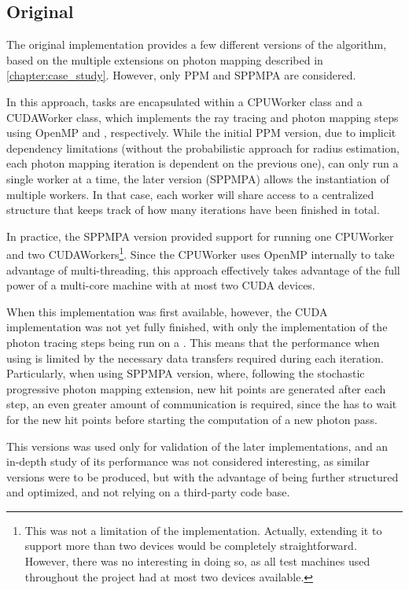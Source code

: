 \documentclass[main.tex]{subfiles}
\begin{document}
\subsection{Original} \label{section:impl_original}

The original implementation provides a few different versions of the algorithm, based on the multiple extensions on photon mapping described in \cref{chapter:case_study}. However, only PPM and SPPMPA are considered.

In this approach, tasks are encapsulated within a CPUWorker class and a CUDAWorker class, which implements the ray tracing and photon mapping steps using \acs{OpenMP} and \cuda, respectively. While the initial PPM version, due to implicit dependency limitations (without the probabilistic approach for radius estimation, each photon mapping iteration is dependent on the previous one), can only run a single worker at a time, the later version (SPPMPA) allows the instantiation of multiple workers. In that case, each worker will share access to a centralized structure that keeps track of how many iterations have been finished in total.

In practice, the SPPMPA version provided support for running one CPUWorker and two CUDAWorkers\footnote{This was not a limitation of the implementation. Actually, extending it to support more than two \cuda devices would be completely straightforward. However, there was no interesting in doing so, as all test machines used throughout the project had at most two \cuda devices available.}. Since the CPUWorker uses \acs{OpenMP} internally to take advantage of multi-threading, this approach effectively takes advantage of the full power of a multi-core machine with at most two \acs{CUDA} devices.

When this implementation was first available, however, the \acs{CUDA} implementation was not yet fully finished, with only the implementation of the photon tracing steps being run on a \gpu. This means that the performance when using \cuda is limited by the necessary data transfers required during each iteration. Particularly, when using SPPMPA version, where, following the stochastic progressive photon mapping extension, new hit points are generated after each step, an even greater amount of communication is required, since the \gpu has to wait for the new hit points before starting the computation of a new photon pass.

This versions was used only for validation of the later implementations, and an in-depth study of its performance was not considered interesting, as similar versions were to be produced, but with the advantage of being further structured and optimized, and not relying on a third-party code base.
\end{document}
